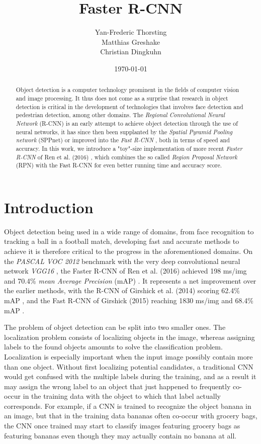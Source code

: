 \documentclass[a4paper]{article}
\title{Faster R-CNN}
\author{Yan-Frederic Thorsting\\Matthias Greshake\\Christian Dingkuhn}
\date{\today}
\begin{document}
\maketitle

\begin{abstract}
Object detection is a computer technology prominent in the fields of computer vision and image processing. It thus does not come as a surprise that research in object detection is critical in the development of technologies that involves face detection and pedestrian detection, among other domains. The \emph{Regional Convolutional Neural Network} (R-CNN) \cite{rcnn} is an early attempt to achieve object detection through the use of neural networks, it has since then been supplanted by the \emph{Spatial Pyramid Pooling network} (SPPnet) \cite{sppnet} or improved into the \emph{Fast R-CNN} \cite{fastrcnn}, both in terms of speed and accuracy. In this work, we introduce a "toy"-size implementation of more recent \emph{Faster R-CNN} of Ren et al. (2016) \cite{fasterrcnn}, which combines the so called \emph{Region Proposal Network} (RPN) \cite{fasterrcnn} with the Fast R-CNN for even better running time and accuracy score.
\end{abstract}

\section{Introduction}
\label{sec:introduction}

Object detection being used in a wide range of domains, from face recognition to tracking a ball in a football match, developing fast and accurate methods to achieve it is therefore critical to the progress in the aforementioned domains. On the \emph{PASCAL VOC 2012} benchmark \cite{voc} with the very deep convolutional neural network \emph{VGG16} \cite{vgg}, the Faster R-CNN of Ren et al. (2016) achieved 198 ms/img and 70.4\% \emph{mean Average Precision} (mAP) \cite{fasterrcnn}. It represents a net improvement over the earlier methods, with the R-CNN of Girshick et al. (2014) scoring 62.4\% mAP \cite{fastrcnn}, and the Fast R-CNN of Girshick (2015) reaching 1830 ms/img and 68.4\% mAP \cite{fasterrcnn}.

The problem of object detection can be split into two smaller ones. The localization problem consists of localizing objects in the image, whereas assigning labels to the found objects amounts to solve the classification problem. Localization is especially important when the input image possibly contain more than one object. Without first localizing potential candidates, a traditional CNN would get confused with the multiple labels during the training, and as a result it may assign the wrong label to an object that just happened to frequently co-occur in the training data with the object to which that label actually corresponds. For example,  if a CNN is trained to recognize the object banana in an image, but that in the training data bananas often co-occur with grocery bags, the CNN once trained may start to classify images featuring grocery bags as featuring bananas even though they may actually contain no banana at all.
\end{document}
